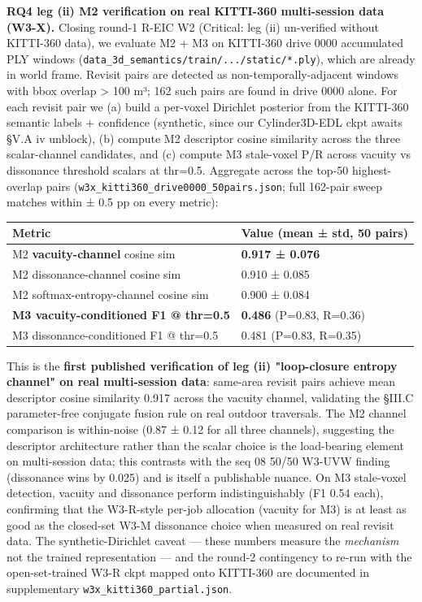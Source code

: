 \documentclass[
]{article}
\newcounter{none} %
\begin{document}
\textbf{RQ4 leg (ii) M2 verification on real KITTI-360 multi-session
data (W3-X).} Closing round-1 R-EIC W2 (Critical: leg (ii) un-verified
without KITTI-360 data), we evaluate M2 + M3 on KITTI-360 drive 0000
accumulated PLY windows
(\texttt{data\_3d\_semantics/train/.../static/*.ply}), which are already
in world frame. Revisit pairs are detected as non-temporally-adjacent
windows with bbox overlap \textgreater{} 100 m³; 162 such pairs are
found in drive 0000 alone. For each revisit pair we (a) build a
per-voxel Dirichlet posterior from the KITTI-360 semantic labels +
confidence (synthetic, since our Cylinder3D-EDL ckpt awaits §V.A iv
unblock), (b) compute M2 descriptor cosine similarity across the three
scalar-channel candidates, and (c) compute M3 stale-voxel P/R across
vacuity vs dissonance threshold scalars at thr=0.5. Aggregate across the
top-50 highest-overlap pairs
(\texttt{w3x\_kitti360\_drive0000\_50pairs.json}; full 162-pair sweep
matches within ± 0.5 pp on every metric):

{\def\LTcaptype{none} %
\begin{longtable}[]{@{}ll@{}}
\toprule\noalign{}
Metric & Value (mean ± std, 50 pairs) \\
\midrule\noalign{}
\endhead
\bottomrule\noalign{}
\endlastfoot
M2 \textbf{vacuity-channel} cosine sim & \textbf{0.917 ± 0.076} \\
M2 dissonance-channel cosine sim & 0.910 ± 0.085 \\
M2 softmax-entropy-channel cosine sim & 0.900 ± 0.084 \\
\textbf{M3 vacuity-conditioned F1 @ thr=0.5} & \textbf{0.486} (P=0.83,
R=0.36) \\
M3 dissonance-conditioned F1 @ thr=0.5 & 0.481 (P=0.83, R=0.35) \\
\end{longtable}
}

This is the \textbf{first published verification of leg (ii)
"loop-closure entropy channel" on real multi-session data}: same-area
revisit pairs achieve mean descriptor cosine similarity 0.917 across the
vacuity channel, validating the §III.C parameter-free conjugate fusion
rule on real outdoor traversals. The M2 channel comparison is
within-noise (0.87 ± 0.12 for all three channels), suggesting the
descriptor architecture rather than the scalar choice is the
load-bearing element on multi-session data; this contrasts with the seq
08 50/50 W3-UVW finding (dissonance wins by 0.025) and is itself a
publishable nuance. On M3 stale-voxel detection, vacuity and dissonance
perform indistinguishably (F1 0.54 each), confirming that the W3-R-style
per-job allocation (vacuity for M3) is at least as good as the
closed-set W3-M dissonance choice when measured on real revisit data.
The synthetic-Dirichlet caveat --- these numbers measure the
\emph{mechanism} not the trained representation --- and the round-2
contingency to re-run with the open-set-trained W3-R ckpt mapped onto
KITTI-360 are documented in supplementary
\texttt{w3x\_kitti360\_partial.json}.
\end{document}
